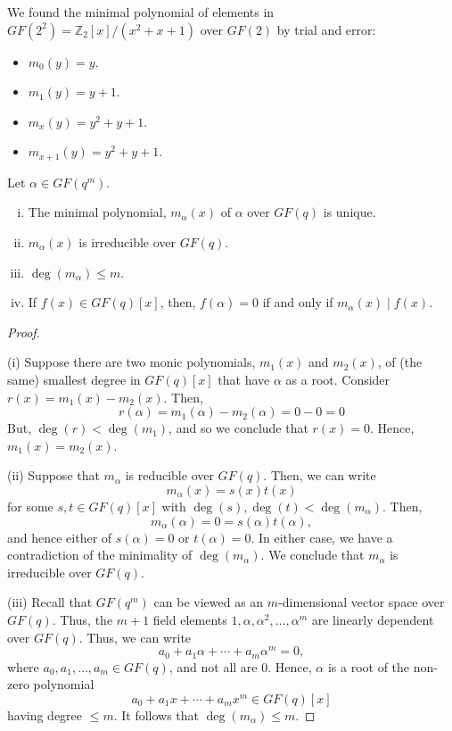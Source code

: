 \begin{exbox}
    \begin{example}
        We found the minimal polynomial of elements in $ GF(2^2)=\mathbb{Z}_2[x]/(x^2+x+1) $
        over $ GF(2) $ by trial and error:
        \begin{itemize}
            \item $ m_0(y)=y $.
            \item $ m_1(y)=y+1 $.
            \item $ m_x(y)=y^2+y+1 $.
            \item $ m_{x+1}(y)=y^2+y+1 $.
        \end{itemize}
    \end{example}
\end{exbox}
\begin{thmbox}
    \begin{theorem}
        Let $ \alpha\in GF(q^m) $.
        \begin{enumerate}[(i)]
            \item The minimal polynomial, $ m_\alpha(x) $ of $ \alpha $
            over $ GF(q) $ is unique.
            \item $ m_\alpha(x) $ is irreducible over $ GF(q) $.
            \item $ \deg(m_\alpha)\leqslant m $.
            \item If $ f(x)\in GF(q)[x] $, then, $ f(\alpha)=0 $ if and only
                  if $ m_\alpha(x)\mid f(x) $.
        \end{enumerate}
    \end{theorem}
\end{thmbox}
\begin{proof} $ \; $

    (i) Suppose there are two monic polynomials, $ m_1(x) $ and $ m_2(x) $,
    of (the same) smallest degree in $ GF(q)[x] $ that have $ \alpha $ as a root. Consider
    $ r(x)=m_1(x)-m_2(x) $. Then,
    \[ r(\alpha)=m_1(\alpha)-m_2(\alpha)=0-0=0 \]
    But, $ \deg(r)<\deg(m_1) $, and so we conclude that $ r(x)=0 $. Hence, $ m_1(x)=m_2(x) $.

    (ii) Suppose that $ m_\alpha $ is reducible over $ GF(q) $. Then, we can write
    \[ m_\alpha(x)=s(x)t(x) \]
    for some $ s,t\in GF(q)[x] $ with $ \deg(s),\deg(t)<\deg(m_\alpha) $. Then,
    \[ m_\alpha(\alpha)=0=s(\alpha)t(\alpha), \]
    and hence either of $ s(\alpha)=0 $ or $ t(\alpha)=0 $. In either case,
    we have a contradiction of the minimality of $ \deg(m_\alpha) $. We conclude
    that $ m_\alpha $ is irreducible over $ GF(q) $.

    (iii) Recall that $ GF(q^m) $ can be viewed as an $ m $-dimensional vector space
    over $ GF(q) $. Thus, the $ m+1 $ field elements $ 1,\alpha,\alpha^2,\ldots ,\alpha^m $
    are linearly dependent over $ GF(q) $. Thus, we can write
    \[ a_0+a_1\alpha+\cdots+a_m\alpha^m=0, \]
    where $ a_0,a_1,\ldots ,a_m\in GF(q) $, and not all are $ 0 $. Hence, $ \alpha $
    is a root of the non-zero polynomial
    \[ a_0+a_1x+\cdots+a_mx^m\in GF(q)[x] \]
    having degree $ \leqslant m $. It follows that $ \deg(m_\alpha) \leqslant m $.
\end{proof}